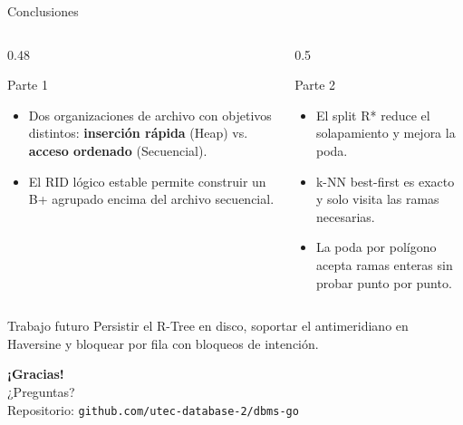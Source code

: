 \documentclass[aspectratio=169,10pt]{beamer}
\begin{document}
\begin{frame}{Conclusiones}
  \begin{columns}[T]
    \begin{column}{0.48\textwidth}
      \begin{block}{Parte 1}
        \small
        \begin{itemize}
          \item Dos organizaciones de archivo con objetivos distintos: \textbf{inserción rápida} (Heap) vs. \textbf{acceso ordenado} (Secuencial).
          \item El RID lógico estable permite construir un B+ agrupado encima del archivo secuencial.
        \end{itemize}
      \end{block}
    \end{column}
    \begin{column}{0.5\textwidth}
      \begin{block}{Parte 2}
        \small
        \begin{itemize}
          \item El split R* reduce el solapamiento y mejora la poda.
          \item k-NN best-first es exacto y solo visita las ramas necesarias.
          \item La poda por polígono acepta ramas enteras sin probar punto por punto.
        \end{itemize}
      \end{block}
    \end{column}
  \end{columns}
  \vspace{0.6em}
  \begin{alertblock}{Trabajo futuro}
    \small Persistir el R-Tree en disco, soportar el antimeridiano en Haversine y bloquear por fila con bloqueos de intención.
  \end{alertblock}
\end{frame}

\begin{frame}
  \centering\vfill
  {\color{primario}\Huge\bfseries ¡Gracias!}\\[1em]
  {\large\color{acento}¿Preguntas?}\\[2em]
  {\small\color{gris}Repositorio: \texttt{github.com/utec-database-2/dbms-go}}
  \vfill
\end{frame}
\end{document}
